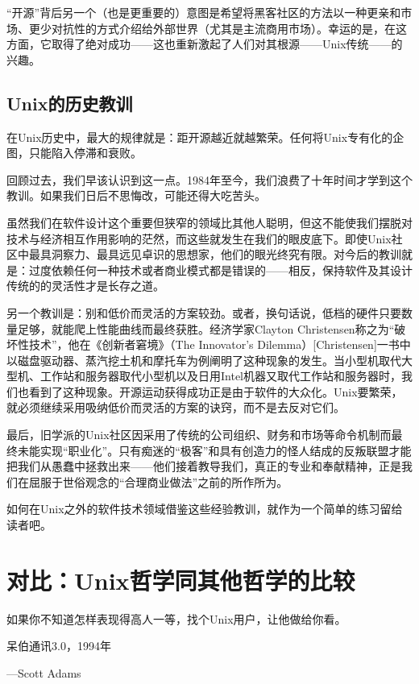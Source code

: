 \documentclass[12pt,oneside]{book}
\begin{document}
\begin{common-format}
“开源”背后另一个（也是更重要的）意图是希望将黑客社区的方法以一种更亲和市场、更少对抗性的方式介绍给外部世界（尤其是主流商用市场）。幸运的是，在这方面，它取得了绝对成功——这也重新激起了人们对其根源——Unix传统——的兴趣。

\section{Unix的历史教训}
在Unix历史中，最大的规律就是：距开源越近就越繁荣。任何将Unix专有化的企图，只能陷入停滞和衰败。

回顾过去，我们早该认识到这一点。1984年至今，我们浪费了十年时间才学到这个教训。如果我们日后不思悔改，可能还得大吃苦头。

虽然我们在软件设计这个重要但狭窄的领域比其他人聪明，但这不能使我们摆脱对技术与经济相互作用影响的茫然，而这些就发生在我们的眼皮底下。即使Unix社区中最具洞察力、最具远见卓识的思想家，他们的眼光终究有限。对今后的教训就是：过度依赖任何一种技术或者商业模式都是错误的——相反，保持软件及其设计传统的的灵活性才是长存之道。

另一个教训是：别和低价而灵活的方案较劲。或者，换句话说，低档的硬件只要数量足够，就能爬上性能曲线而最终获胜。经济学家Clayton Christensen称之为“破坏性技术”，他在《创新者窘境》（The Innovator's Dilemma）[Christensen]一书中以磁盘驱动器、蒸汽挖土机和摩托车为例阐明了这种现象的发生。当小型机取代大型机、工作站和服务器取代小型机以及日用Intel机器又取代工作站和服务器时，我们也看到了这种现象。开源运动获得成功正是由于软件的大众化。Unix要繁荣，就必须继续采用吸纳低价而灵活的方案的诀窍，而不是去反对它们。

最后，旧学派的Unix社区因采用了传统的公司组织、财务和市场等命令机制而最终未能实现“职业化”。只有痴迷的“极客”和具有创造力的怪人结成的反叛联盟才能把我们从愚蠢中拯救出来——他们接着教导我们，真正的专业和奉献精神，正是我们在屈服于世俗观念的“合理商业做法”之前的所作所为。

如何在Unix之外的软件技术领域借鉴这些经验教训，就作为一个简单的练习留给读者吧。




\chapter{对比：Unix哲学同其他哲学的比较}
\begin{flushright}
\begin{notecard}{18em}
如果你不知道怎样表现得高人一等，找个Unix用户，让他做给你看。

{\hfill 呆伯通讯3.0，1994年}

{\hfill —Scott Adams}
\end{notecard}
\end{flushright}


\end{common-format}
\end{document}
